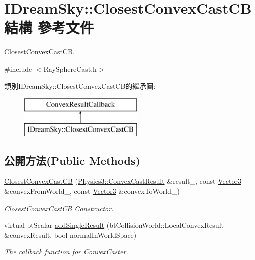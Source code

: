 \hypertarget{struct_i_dream_sky_1_1_closest_convex_cast_c_b}{}\section{I\+Dream\+Sky\+:\+:Closest\+Convex\+Cast\+CB 結構 參考文件}
\label{struct_i_dream_sky_1_1_closest_convex_cast_c_b}


\hyperlink{struct_i_dream_sky_1_1_closest_convex_cast_c_b}{Closest\+Convex\+Cast\+CB}.  




{\ttfamily \#include $<$Ray\+Sphere\+Cast.\+h$>$}

類別\+I\+Dream\+Sky\+:\+:Closest\+Convex\+Cast\+C\+B的繼承圖\+:\begin{figure}[H]
\begin{center}
\leavevmode
\includegraphics[height=2.000000cm]{struct_i_dream_sky_1_1_closest_convex_cast_c_b}
\end{center}
\end{figure}
\subsection*{公開方法(Public Methods)}
\begin{DoxyCompactItemize}
\item 
\hyperlink{struct_i_dream_sky_1_1_closest_convex_cast_c_b_a15b0f5a53b795b56bb908911b725e948}{Closest\+Convex\+Cast\+CB} (\hyperlink{class_i_dream_sky_1_1_physics3_1_1_convex_cast_result}{Physics3\+::\+Convex\+Cast\+Result} \&result\+\_\+, const \hyperlink{class_i_dream_sky_1_1_vector3}{Vector3} \&convex\+From\+World\+\_\+, const \hyperlink{class_i_dream_sky_1_1_vector3}{Vector3} \&convex\+To\+World\+\_\+)
\begin{DoxyCompactList}\small\item\em \hyperlink{struct_i_dream_sky_1_1_closest_convex_cast_c_b}{Closest\+Convex\+Cast\+CB} Constructor. \end{DoxyCompactList}\item 
virtual bt\+Scalar \hyperlink{struct_i_dream_sky_1_1_closest_convex_cast_c_b_a4a7fa8cd0c1d9f107ac54474a0eb06b8}{add\+Single\+Result} (bt\+Collision\+World\+::\+Local\+Convex\+Result \&convex\+Result, bool normal\+In\+World\+Space)
\begin{DoxyCompactList}\small\item\em The callback function for Convex\+Caster. \end{DoxyCompactList}\end{DoxyCompactItemize}
